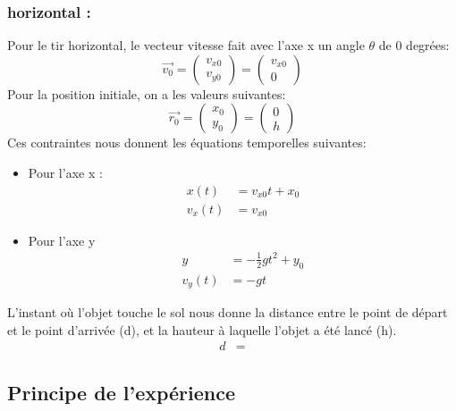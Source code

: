 \documentclass[12pt,a4paper]{article}
\begin{document}
    \subsubsection{horizontal :}
    Pour le tir horizontal, le vecteur vitesse fait avec l'axe x un angle $\theta$ de 0 degrées:
    \begin{equation*}
        \vec{v_0}=
        \begin{pmatrix}
            v_{x0} \\
            v_{y0}
        \end{pmatrix}
        =
        \begin{pmatrix}
            v_{x0} \\
            0
        \end{pmatrix}
    \end{equation*}
    Pour la position initiale, on a les valeurs suivantes:
    \begin{equation*}
        \vec{r_0}=
        \begin{pmatrix}
            x_0 \\
            y_0
        \end{pmatrix}
        =
        \begin{pmatrix}
            0 \\
            h
        \end{pmatrix}
    \end{equation*}
    Ces contraintes nous donnent les équations temporelles suivantes:
    \begin{itemize}
        \item Pour l'axe x :
        \begin{align*}
            x(t)&=v_{x0}t+x_0 \\
            v_x(t)&=v_{x0}
        \end{align*}
        \item Pour l'axe y
        \begin{align*}
            y&=-\frac{1}{2}gt^2+y_0 \\
            v_y(t)&=-gt
        \end{align*}
    \end{itemize}
    L'instant où l'objet touche le sol nous donne la distance entre le point de départ et le point d'arrivée (d), et la hauteur à laquelle l'objet a été lancé (h).
    \begin{align*}
        d&=
    \end{align*}
    \subsection{Principe de l'expérience}
    
\end{document}
